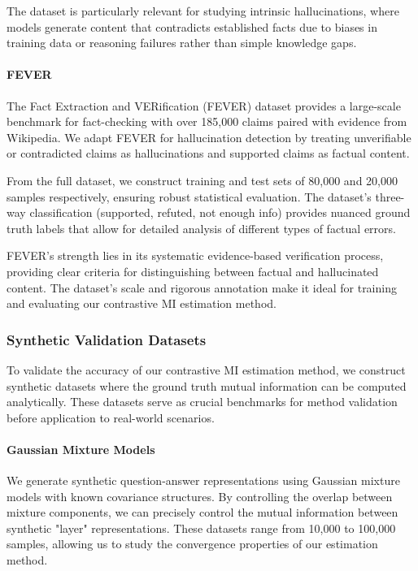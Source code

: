 The dataset is particularly relevant for studying intrinsic hallucinations, where models generate content that contradicts established facts due to biases in training data or reasoning failures rather than simple knowledge gaps.

\paragraph{FEVER}
The Fact Extraction and VERification (FEVER) dataset \citep{thorne2018fever} provides a large-scale benchmark for fact-checking with over 185,000 claims paired with evidence from Wikipedia. We adapt FEVER for hallucination detection by treating unverifiable or contradicted claims as hallucinations and supported claims as factual content.

From the full dataset, we construct training and test sets of 80,000 and 20,000 samples respectively, ensuring robust statistical evaluation. The dataset's three-way classification (supported, refuted, not enough info) provides nuanced ground truth labels that allow for detailed analysis of different types of factual errors.

FEVER's strength lies in its systematic evidence-based verification process, providing clear criteria for distinguishing between factual and hallucinated content. The dataset's scale and rigorous annotation make it ideal for training and evaluating our contrastive MI estimation method.

\subsubsection{Synthetic Validation Datasets}

To validate the accuracy of our contrastive MI estimation method, we construct synthetic datasets where the ground truth mutual information can be computed analytically. These datasets serve as crucial benchmarks for method validation before application to real-world scenarios.

\paragraph{Gaussian Mixture Models}
We generate synthetic question-answer representations using Gaussian mixture models with known covariance structures. By controlling the overlap between mixture components, we can precisely control the mutual information between synthetic "layer" representations. These datasets range from 10,000 to 100,000 samples, allowing us to study the convergence properties of our estimation method.

